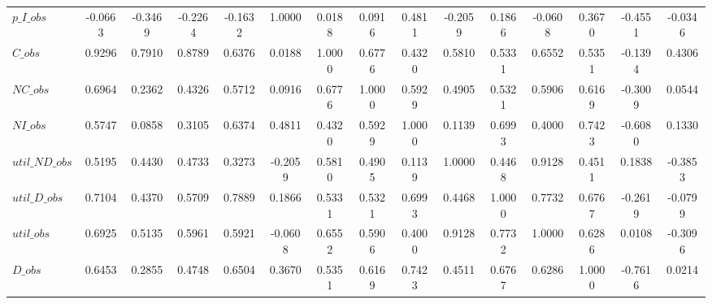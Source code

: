 \begin{center}
\begin{longtable}{lcccccccccccccc}
$p\_I\_obs      $	 & 	          -0.0663	 & 	          -0.3469	 & 	          -0.2264	 & 	          -0.1632	 & 	           1.0000	 & 	           0.0188	 & 	           0.0916	 & 	           0.4811	 & 	          -0.2059	 & 	           0.1866	 & 	          -0.0608	 & 	           0.3670	 & 	          -0.4551	 & 	          -0.0346 \\ 
$C\_obs         $	 & 	           0.9296	 & 	           0.7910	 & 	           0.8789	 & 	           0.6376	 & 	           0.0188	 & 	           1.0000	 & 	           0.6776	 & 	           0.4320	 & 	           0.5810	 & 	           0.5331	 & 	           0.6552	 & 	           0.5351	 & 	          -0.1394	 & 	           0.4306 \\ 
$NC\_obs        $	 & 	           0.6964	 & 	           0.2362	 & 	           0.4326	 & 	           0.5712	 & 	           0.0916	 & 	           0.6776	 & 	           1.0000	 & 	           0.5929	 & 	           0.4905	 & 	           0.5321	 & 	           0.5906	 & 	           0.6169	 & 	          -0.3009	 & 	           0.0544 \\ 
$NI\_obs        $	 & 	           0.5747	 & 	           0.0858	 & 	           0.3105	 & 	           0.6374	 & 	           0.4811	 & 	           0.4320	 & 	           0.5929	 & 	           1.0000	 & 	           0.1139	 & 	           0.6993	 & 	           0.4000	 & 	           0.7423	 & 	          -0.6080	 & 	           0.1330 \\ 
$util\_ND\_obs  $	 & 	           0.5195	 & 	           0.4430	 & 	           0.4733	 & 	           0.3273	 & 	          -0.2059	 & 	           0.5810	 & 	           0.4905	 & 	           0.1139	 & 	           1.0000	 & 	           0.4468	 & 	           0.9128	 & 	           0.4511	 & 	           0.1838	 & 	          -0.3853 \\ 
$util\_D\_obs   $	 & 	           0.7104	 & 	           0.4370	 & 	           0.5709	 & 	           0.7889	 & 	           0.1866	 & 	           0.5331	 & 	           0.5321	 & 	           0.6993	 & 	           0.4468	 & 	           1.0000	 & 	           0.7732	 & 	           0.6767	 & 	          -0.2619	 & 	          -0.0799 \\ 
$util\_obs      $	 & 	           0.6925	 & 	           0.5135	 & 	           0.5961	 & 	           0.5921	 & 	          -0.0608	 & 	           0.6552	 & 	           0.5906	 & 	           0.4000	 & 	           0.9128	 & 	           0.7732	 & 	           1.0000	 & 	           0.6286	 & 	           0.0108	 & 	          -0.3096 \\ 
$D\_obs         $	 & 	           0.6453	 & 	           0.2855	 & 	           0.4748	 & 	           0.6504	 & 	           0.3670	 & 	           0.5351	 & 	           0.6169	 & 	           0.7423	 & 	           0.4511	 & 	           0.6767	 & 	           0.6286	 & 	           1.0000	 & 	          -0.7616	 & 	           0.0214 \\ 

\end{longtable}
\end{center}
